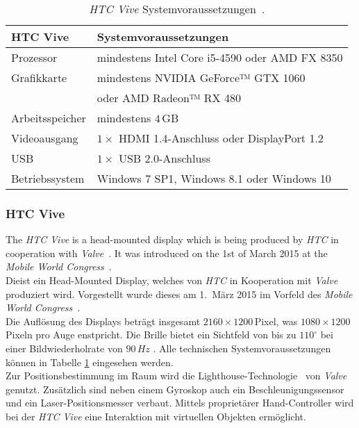 \begin{table}
	\centering
	\begin{tabular}{|l|l|}
		\hline
		\Absatzbox{}
		\textbf{HTC Vive}& \textbf{Systemvoraussetzungen} \\
		\hline
		Prozessor & mindestens Intel Core i5-4590 oder AMD FX 8350\\
		\hline
		Grafikkarte & mindestens NVIDIA GeForce™ GTX 1060\\
		&oder AMD Radeon™ RX 480\\
		\hline
		Arbeitsspeicher & mindestens $4\,$GB\\		
		\hline
		Videoausgang & $1\times$ HDMI 1.4-Anschluss oder DisplayPort 1.2\\
		\hline
		USB & $1\times$ USB 2.0-Anschluss\\
		\hline
		Betriebssystem & Windows 7 SP1, Windows 8.1 oder Windows 10\\
		\hline
	\end{tabular}
	\caption[\emph{HTC Vive} Systemvoraussetzungen]{\emph{HTC Vive} Systemvoraussetzungen~\cite{website:HTC_Vive_Ready}.}
	\label{tab:viveReq}
\end{table}




\subsubsection{HTC Vive}\label{sec:Vive} 

The \textit{HTC Vive}  is a head-mounted display which is being produced by \textit{HTC} in cooperation with \textit{Valve}~\cite{website:Valve}. It was introduced on the 1st of March 2015 at the \textit{Mobile World Congress}~\cite{website:mobileworldcongress}.\\


Dieist ein Head-Mounted Display, welches von \textit{HTC} in Kooperation mit \textit{Valve}~\cite{website:Valve} produziert wird. Vorgestellt wurde dieses am 1.\ März 2015 im Vorfeld des \textit{Mobile World Congress}~\cite{website:mobileworldcongress}.\\
Die Auflösung des Displays beträgt insgesamt $2160\times1200$\,Pixel, was $1080\times1200$\,Pixeln pro Auge enstpricht. Die Brille bietet ein Sichtfeld von bis zu $110^\circ$ bei einer Bildwiederholrate von $90\,Hz$ \cite{website:HTC_Vive}. Alle technischen Systemvoraussetzungen können in Tabelle \ref{tab:viveReq} eingesehen werden. \\
Zur Positionsbestimmung im Raum wird die Lighthouse-Technologie~\cite{website:Lighthouses} von \textit{Valve} genutzt. Zusätzlich sind neben einem Gyroskop auch ein Beschleunigungssensor und ein Laser-Positionsmesser verbaut. Mittels proprietärer Hand-Controller wird bei der \emph{HTC Vive} eine Interaktion mit virtuellen Objekten ermöglicht.








